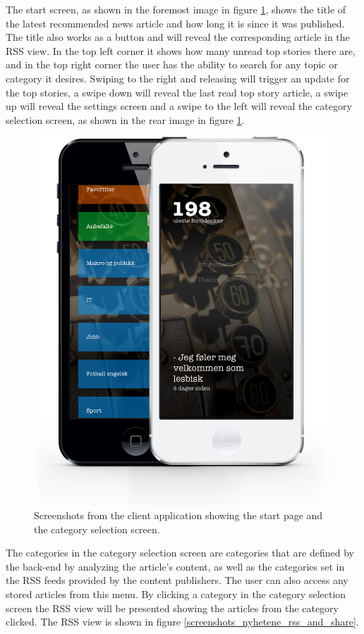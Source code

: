 The start screen, as shown in the foremost image in figure \ref{screenshots_nyhetene_start_and_category}, shows the title of the latest recommended news article and how long it is since it was published. The title also works as a button and will reveal the corresponding article in the RSS view. In the top left corner it shows how many unread top stories there are, and in the top right corner the user has the ability to search for any topic or category it desires. Swiping to the right and releasing will trigger an update for the top stories, a swipe down will reveal the last read top story article, a swipe up will reveal the settings screen and a swipe to the left will reveal the category selection screen, as shown in the rear image in figure \ref{screenshots_nyhetene_start_and_category}.

\begin{figure}[!htbp]
\centering
\includegraphics[width=120mm]{GFX/clientApp/categoryAndFrontPage.png}
\caption{Screenshots from the client application showing the start page and the category selection screen.}
\label{screenshots_nyhetene_start_and_category}
\end{figure}

The categories in the category selection screen are categories that are defined by the back-end by analyzing the article's content, as well as the categories set in the RSS feeds provided by the content publishers. The user can also access any stored articles from this menu. By clicking a category in the category selection screen the RSS view will be presented showing the articles from the category clicked. The RSS view is shown in figure \ref{screenshots_nyhetene_rss_and_share}. 

